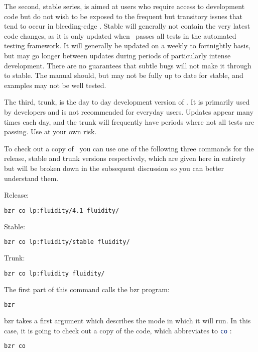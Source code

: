 The second, stable series, is aimed at users who require access to development
code but do not wish to be exposed to the frequent but transitory issues that
tend to occur in bleeding-edge \fluidity. Stable will generally not contain the
very latest code changes, as it is only updated when \fluidity\ passes all
tests in the automated testing framework. It will generally be updated on a
weekly to fortnightly basis, but may go longer between updates during periods
of particularly intense development. There are no guarantees that subtle bugs
will not make it through to stable. The manual should, but may not be fully up
to date for stable, and examples may not be well tested.

The third, trunk, is the day to day development version of \fluidity. It is
primarily used by developers and is not recommended for everyday users. Updates
appear many times each day, and the trunk will frequently have periods where
not all tests are passing. Use at your own risk.

To check out a copy of \fluidity\ you can use one of the following three
commands for the release, stable and trunk versions respectively, which 
are given here in entirety but will be broken down in the subsequent 
discussion so you can better understand them.

Release:
\begin{lstlisting}[language=Bash]
bzr co lp:fluidity/4.1 fluidity/
\end{lstlisting}

Stable:
\begin{lstlisting}[language=Bash]
bzr co lp:fluidity/stable fluidity/
\end{lstlisting}

Trunk:
\begin{lstlisting}[language=Bash]
bzr co lp:fluidity fluidity/
\end{lstlisting}

The first part of this command calls the bzr program:

\begin{lstlisting}[language=Bash]
bzr
\end{lstlisting}

bzr takes a first argument which describes the mode in which it will run. In
this case, it is going to check out a copy of the code, which abbreviates to
\lstinline[language=Bash]+co+ :

\begin{lstlisting}[language=Bash]
bzr co
\end{lstlisting}

